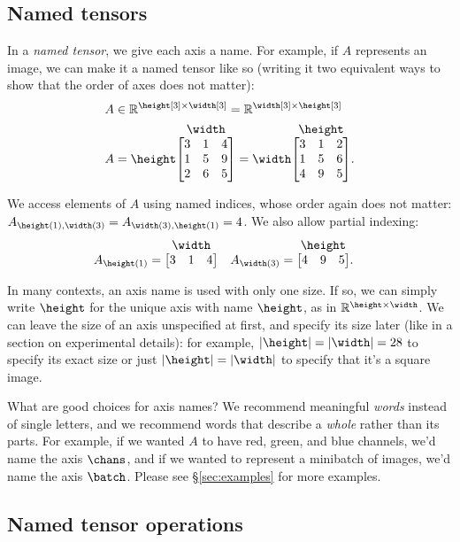 \documentclass{article}
\makeatletter
\newcommand{\nmatrix}[3]{#1\begin{array}[b]{@{}c@{}}#2\\\begin{bmatrix}#3\end{bmatrix}\end{array}}
\newcommand{\reals}{\mathbb{R}}
\makeatother
\begin{document}
\subsection{Named tensors}

In a \emph{named tensor}, we give each axis a name. For example, if $A$ represents an image, we can make it a named tensor like so (writing it two equivalent ways to show that the order of axes does not matter):
\begin{align*}
  A &\in \reals^{\height[3] \times \width[3]} = \reals^{\width[3] \times \height[3]} \\
  A &= \nmatrix{\height}{\width}{
    3 & 1 & 4 \\
    1 & 5 & 9 \\
    2 & 6 & 5
  } = \nmatrix{\width}{\height}{
    3 & 1 & 2 \\
    1 & 5 & 6 \\
    4 & 9 & 5
  }.
\end{align*}

We access elements of $A$ using named indices, whose order again does not matter: $A_{\height(1), \width(3)} = A_{\width(3), \height(1)} = 4$.
We also allow partial indexing:
\begin{align*}
A_{\height(1)} &= \nmatrix{}{\width}{
  3 & 1 & 4
}
&
A_{\width(3)} &= \nmatrix{}{\height}{
  4 & 9 & 5
}.
\end{align*}

In many contexts, an axis name is used with only one size. If so, we can simply write $\height$ for the unique axis with name $\height$, as in $\mathbb{R}^{\height \times \width}$. We can leave the size of an axis unspecified at first, and specify its size later (like in a section on experimental details): for example, $|\height|=|\width|=28$ to specify its exact size or just $|\height|=|\width|$ to specify that it's a square image.

What are good choices for axis names? We recommend meaningful \emph{words} instead of single letters, and we recommend words that describe a \emph{whole} rather than its parts. For example, if we wanted $A$ to have red, green, and blue channels, we'd name the axis $\chans$, and if we wanted to represent a minibatch of images, we'd name the axis $\batch$. Please see \S\ref{sec:examples} for more examples.

\subsection{Named tensor operations}
\label{sec:operations}
\end{document}
